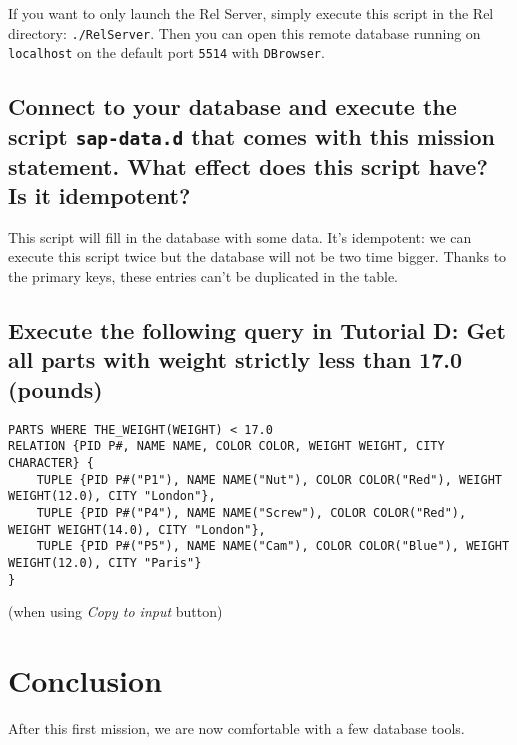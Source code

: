 \documentclass[a4paper,11pt]{article}
\begin{document}
If you want to only launch the Rel Server, simply execute this script in the Rel directory: \texttt{./RelServer}. Then you can open this remote database running on \texttt{localhost} on the default port \texttt{5514} with \texttt{DBrowser}.


\subsection{Connect to your database and execute the script \texttt{sap-data.d} that comes with this mission statement. What effect does this script have? Is it idempotent?}
This script will fill in the database with some data. It's idempotent: we can execute this script twice but the database will not be two time bigger. Thanks to the primary keys, these entries can't be duplicated in the table.


\subsection{Execute the following query in Tutorial D: Get all parts with weight strictly less than 17.0 (pounds)}
\begin{lstlisting}[flexiblecolumns=false]
PARTS WHERE THE_WEIGHT(WEIGHT) < 17.0
RELATION {PID P#, NAME NAME, COLOR COLOR, WEIGHT WEIGHT, CITY CHARACTER} {
	TUPLE {PID P#("P1"), NAME NAME("Nut"), COLOR COLOR("Red"), WEIGHT WEIGHT(12.0), CITY "London"},
	TUPLE {PID P#("P4"), NAME NAME("Screw"), COLOR COLOR("Red"), WEIGHT WEIGHT(14.0), CITY "London"},
	TUPLE {PID P#("P5"), NAME NAME("Cam"), COLOR COLOR("Blue"), WEIGHT WEIGHT(12.0), CITY "Paris"}
}
\end{lstlisting}
(when using \textit{Copy to input} button)

\section*{Conclusion}
After this first mission, we are now comfortable with a few database tools.
\end{document}
